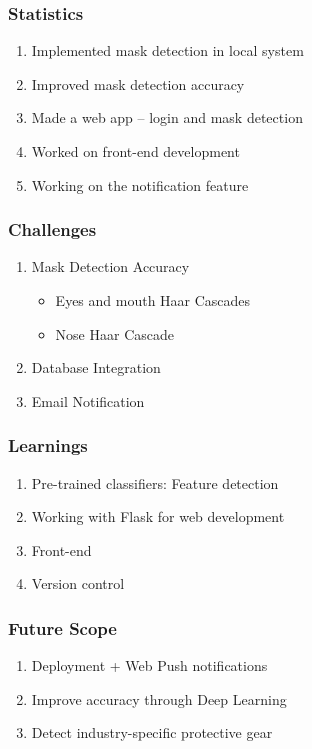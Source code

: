 \documentclass[14pt]{beamer}
\begin{document}
\begin{frame}
    \frametitle{Statistics}
    \begin{enumerate}
        \item Implemented mask detection in local system
        \item Improved mask detection accuracy
        \item Made a web app -- login and mask detection
        \item Worked on front-end development
        \item Working on the notification feature
    \end{enumerate}
\end{frame}

\begin{frame}
    \frametitle{Challenges}
    \begin{enumerate}
        \item Mask Detection Accuracy
            \begin{itemize}
            \item Eyes and mouth Haar Cascades
            \item Nose Haar Cascade
            \end{itemize}
        \item Database Integration
        \item Email Notification 
    \end{enumerate}
\end{frame}


\begin{frame}
    \frametitle{Learnings}
    \begin{enumerate}
        \item Pre-trained classifiers: Feature detection
        \item Working with Flask for web development
        \item Front-end
        \item Version control
    \end{enumerate}
\end{frame}



\begin{frame}
    \frametitle{Future Scope}
    \begin{enumerate}
        \item Deployment + Web Push notifications
        \item Improve accuracy through Deep Learning
        \item Detect industry-specific protective gear
    \end{enumerate}
\end{frame}
\end{document}

